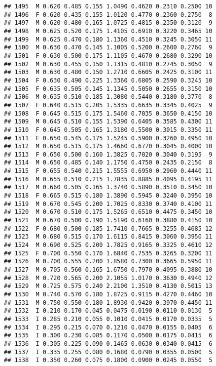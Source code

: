 \documentclass[
]{article}
\begin{document}
\begin{verbatim}
## 1495  M 0.620 0.485 0.155 1.0490 0.4620 0.2310 0.2500 10
## 1496  F 0.620 0.435 0.155 1.0120 0.4770 0.2360 0.2750  8
## 1497  M 0.620 0.480 0.165 1.0725 0.4815 0.2350 0.3120  9
## 1498  M 0.625 0.520 0.175 1.4105 0.6910 0.3220 0.3465 10
## 1499  M 0.625 0.470 0.180 1.1360 0.4510 0.3245 0.3050 11
## 1500  M 0.630 0.470 0.145 1.1005 0.5200 0.2600 0.2760  9
## 1501  F 0.630 0.500 0.175 1.1105 0.4670 0.2680 0.3290 10
## 1502  M 0.630 0.455 0.150 1.1315 0.4810 0.2745 0.3050  9
## 1503  M 0.630 0.480 0.150 1.2710 0.6605 0.2425 0.3100 11
## 1504  F 0.630 0.490 0.225 1.3360 0.6805 0.2590 0.3245 10
## 1505  F 0.635 0.505 0.145 1.1345 0.5050 0.2655 0.3150 10
## 1506  M 0.635 0.510 0.185 1.3080 0.5440 0.3180 0.3770  8
## 1507  F 0.640 0.515 0.205 1.5335 0.6635 0.3345 0.4025  9
## 1508  F 0.645 0.515 0.175 1.5460 0.7035 0.3650 0.4150 10
## 1509  M 0.645 0.510 0.155 1.5390 0.6405 0.3585 0.4300 11
## 1510  F 0.645 0.505 0.165 1.3180 0.5500 0.3015 0.3350 11
## 1511  F 0.650 0.545 0.175 1.5245 0.5900 0.3260 0.4950 10
## 1512  M 0.650 0.515 0.175 1.4660 0.6770 0.3045 0.4000 10
## 1513  F 0.650 0.500 0.160 1.3825 0.7020 0.3040 0.3195  9
## 1514  M 0.650 0.485 0.140 1.1750 0.4750 0.2435 0.2150  8
## 1515  F 0.655 0.540 0.215 1.5555 0.6950 0.2960 0.4440 11
## 1516  M 0.655 0.510 0.215 1.7835 0.8885 0.4095 0.4195 11
## 1517  M 0.660 0.505 0.165 1.3740 0.5890 0.3510 0.3450 10
## 1518  F 0.665 0.515 0.180 1.3890 0.5945 0.3240 0.3950 10
## 1519  M 0.670 0.545 0.200 1.7025 0.8330 0.3740 0.4100 11
## 1520  M 0.670 0.510 0.175 1.5265 0.6510 0.4475 0.3450 10
## 1521  M 0.670 0.500 0.190 1.5190 0.6160 0.3880 0.4150 10
## 1522  F 0.680 0.500 0.185 1.7410 0.7665 0.3255 0.4685 12
## 1523  M 0.680 0.515 0.170 1.6115 0.8415 0.3060 0.3950 11
## 1524  M 0.690 0.525 0.200 1.7825 0.9165 0.3325 0.4610 12
## 1525  F 0.700 0.550 0.170 1.6840 0.7535 0.3265 0.3200 11
## 1526  M 0.700 0.555 0.200 1.8580 0.7300 0.3665 0.5950 11
## 1527  M 0.705 0.560 0.165 1.6750 0.7970 0.4095 0.3880 10
## 1528  M 0.720 0.565 0.200 2.1055 1.0170 0.3630 0.4940 12
## 1529  M 0.725 0.575 0.240 2.2100 1.3510 0.4130 0.5015 13
## 1530  M 0.740 0.570 0.180 1.8725 0.9115 0.4270 0.4460 10
## 1531  M 0.750 0.550 0.180 1.8930 0.9420 0.3970 0.4450 11
## 1532  I 0.210 0.170 0.045 0.0475 0.0190 0.0110 0.0130  5
## 1533  I 0.285 0.210 0.055 0.1010 0.0415 0.0170 0.0335  5
## 1534  I 0.295 0.215 0.070 0.1210 0.0470 0.0155 0.0405  6
## 1535  I 0.300 0.230 0.085 0.1170 0.0500 0.0175 0.0415  6
## 1536  I 0.305 0.225 0.090 0.1465 0.0630 0.0340 0.0415  6
## 1537  I 0.335 0.255 0.080 0.1680 0.0790 0.0355 0.0500  5
## 1538  I 0.350 0.260 0.075 0.1800 0.0900 0.0245 0.0550  5

\end{verbatim}
\end{document}
